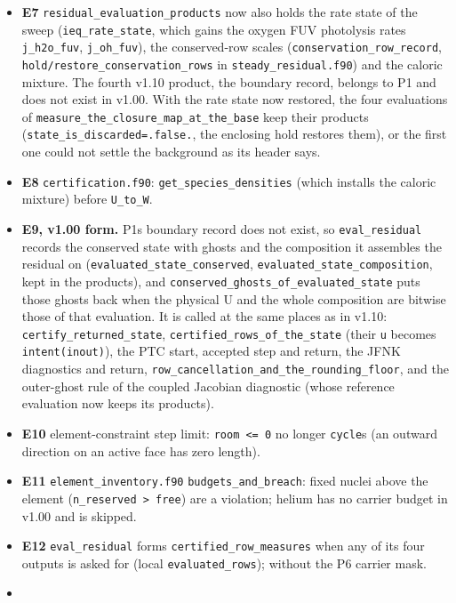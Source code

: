 \documentclass[english,a4paper]{my_memo}
\begin{document}
\begin{itemize}
\item
  \textbf{E7} \texttt{residual\_evaluation\_products} now also holds the rate state of the sweep (\texttt{ieq\_rate\_state}, which gains the oxygen FUV photolysis rates \texttt{j\_h2o\_fuv}, \texttt{j\_oh\_fuv}), the conserved-row scales (\texttt{conservation\_row\_record}, \texttt{hold/restore\_conservation\_rows} in \texttt{steady\_residual.f90}) and the caloric mixture. The fourth v1.10 product, the boundary record, belongs to P1 and does not exist in v1.00. With the rate state now restored, the four evaluations of \texttt{measure\_the\_closure\_map\_at\_the\_base} keep their products (\texttt{state\_is\_discarded=.false.}, the enclosing hold restores them), or the first one could not settle the background as its header says.
\item
  \textbf{E8} \texttt{certification.f90}: \texttt{get\_species\_densities} (which installs the caloric mixture) before \texttt{U\_to\_W}.
\item
  \textbf{E9, v1.00 form.} P1\textquotesingle s boundary record does not exist, so \texttt{eval\_residual} records the conserved state with ghosts and the composition it assembles the residual on (\texttt{evaluated\_state\_conserved}, \texttt{evaluated\_state\_composition}, kept in the products), and \texttt{conserved\_ghosts\_of\_evaluated\_state} puts those ghosts back when the physical U and the whole composition are bitwise those of that evaluation. It is called at the same places as in v1.10: \texttt{certify\_returned\_state}, \texttt{certified\_rows\_of\_the\_state} (their \texttt{u} becomes \texttt{intent(inout)}), the PTC start, accepted step and return, the JFNK diagnostics and return, \texttt{row\_cancellation\_and\_the\_rounding\_floor}, and the outer-ghost rule of the coupled Jacobian diagnostic (whose reference evaluation now keeps its products).
\item
  \textbf{E10} element-constraint step limit: \texttt{room\ \textless{}=\ 0} no longer \texttt{cycle}s (an outward direction on an active face has zero length).
\item
  \textbf{E11} \texttt{element\_inventory.f90} \texttt{budgets\_and\_breach}: fixed nuclei above the element (\texttt{n\_reserved\ \textgreater{}\ free}) are a violation; helium has no carrier budget in v1.00 and is skipped.
\item
  \textbf{E12} \texttt{eval\_residual} forms \texttt{certified\_row\_measures} when any of its four outputs is asked for (local \texttt{evaluated\_rows}); without the P6 carrier mask.
\item

\end{itemize}
\end{document}
